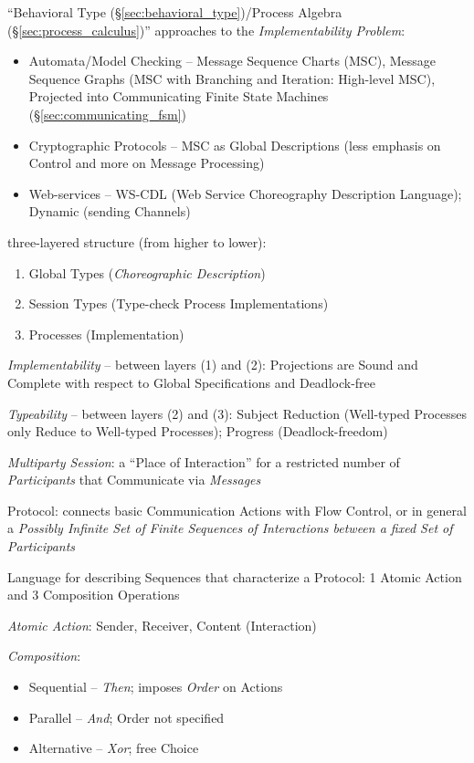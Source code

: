 ``Behavioral Type (\S\ref{sec:behavioral_type})/Process Algebra
(\S\ref{sec:process_calculus})'' approaches to the
\emph{Implementability Problem}:
\begin{itemize}
  \item Automata/Model Checking -- Message Sequence Charts (MSC),
    Message Sequence Graphs (MSC with Branching and Iteration:
    High-level MSC), Projected into Communicating Finite State
    Machines (\S\ref{sec:communicating_fsm})
  \item Cryptographic Protocols -- MSC as Global Descriptions (less
    emphasis on Control and more on Message Processing)
  \item Web-services -- WS-CDL (Web Service Choreography Description
    Language); Dynamic (sending Channels)
\end{itemize}

three-layered structure (from higher to lower):
\begin{enumerate}
  \item Global Types (\emph{Choreographic Description})
  \item Session Types (Type-check Process Implementations)
  \item Processes (Implementation)
\end{enumerate}

\emph{Implementability} -- between layers (1) and (2): Projections
are Sound and Complete with respect to Global Specifications and
Deadlock-free

\emph{Typeability} -- between layers (2) and (3): Subject Reduction
(Well-typed Processes only Reduce to Well-typed Processes); Progress
(Deadlock-freedom)


\emph{Multiparty Session}: a ``Place of Interaction'' for a restricted
number of \emph{Participants} that Communicate via \emph{Messages}

Protocol: connects basic Communication Actions with Flow Control, or
in general a \emph{Possibly Infinite Set of Finite Sequences of
  Interactions between a fixed Set of Participants}

Language for describing Sequences that characterize a Protocol: 1
Atomic Action and 3 Composition Operations

\emph{Atomic Action}: Sender, Receiver, Content (Interaction)

\emph{Composition}:

\begin{itemize}
  \item Sequential -- \emph{Then}; imposes \emph{Order} on Actions
  \item Parallel -- \emph{And}; Order not specified
  \item Alternative -- \emph{Xor}; free Choice
\end{itemize}

